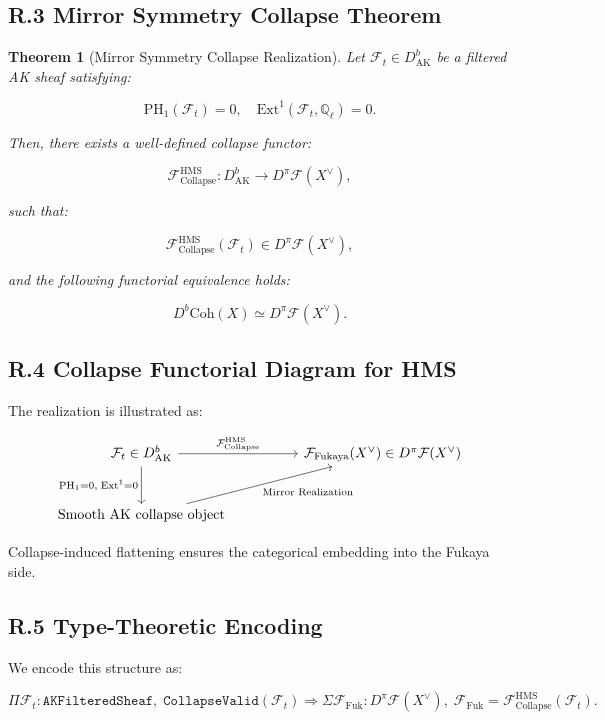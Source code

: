 \documentclass[11pt]{article}
\newtheorem{theorem}{Theorem}[section]
\begin{document}
\subsection*{R.3 Mirror Symmetry Collapse Theorem}

\begin{theorem}[Mirror Symmetry Collapse Realization]
Let $\mathcal{F}_t \in D^b_{\mathrm{AK}}$ be a filtered AK sheaf satisfying:

\[
\mathrm{PH}_1(\mathcal{F}_t) = 0, \quad \mathrm{Ext}^1(\mathcal{F}_t, \mathbb{Q}_\ell) = 0.
\]

Then, there exists a well-defined collapse functor:

\[
\mathcal{F}_{\mathrm{Collapse}}^{\mathrm{HMS}} : D^b_{\mathrm{AK}} \longrightarrow D^\pi\mathcal{F}(X^\vee),
\]

such that:

\[
\mathcal{F}_{\mathrm{Collapse}}^{\mathrm{HMS}}(\mathcal{F}_t) \in D^\pi\mathcal{F}(X^\vee),
\]

and the following functorial equivalence holds:

\[
D^b\mathrm{Coh}(X) \simeq D^\pi\mathcal{F}(X^\vee).
\]
\end{theorem}

\subsection*{R.4 Collapse Functorial Diagram for HMS}

The realization is illustrated as:

\[
\begin{tikzcd}[column sep=huge, row sep=large]
\mathcal{F}_t \in D^b_{\mathrm{AK}} \arrow[r, "{\mathcal{F}_{\mathrm{Collapse}}^{\mathrm{HMS}}}"] \arrow[d, swap, "{\mathrm{PH}_1 = 0,\; \mathrm{Ext}^1 = 0}"]
& \mathcal{F}_{\mathrm{Fukaya}}(X^\vee) \in D^\pi\mathcal{F}(X^\vee) \\
\text{Smooth AK collapse object} \arrow[ru, swap, "{\text{Mirror Realization}}"] &
\end{tikzcd}
\]

Collapse-induced flattening ensures the categorical embedding into the Fukaya side.

\subsection*{R.5 Type-Theoretic Encoding}

We encode this structure as:

\[
\Pi \mathcal{F}_t : \texttt{AKFilteredSheaf},\;
\texttt{CollapseValid}(\mathcal{F}_t)
\Rightarrow
\Sigma \mathcal{F}_{\mathrm{Fuk}} : D^\pi\mathcal{F}(X^\vee),\;
\mathcal{F}_{\mathrm{Fuk}} = \mathcal{F}_{\mathrm{Collapse}}^{\mathrm{HMS}}(\mathcal{F}_t).
\]
\end{document}
